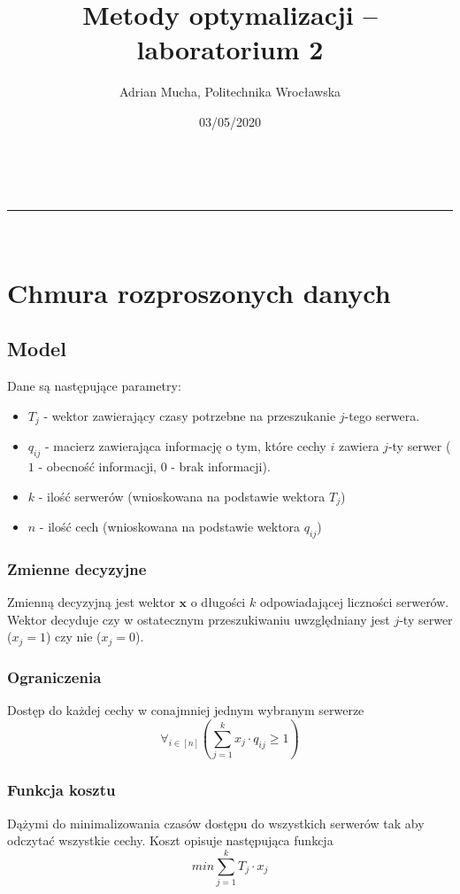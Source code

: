 \documentclass[a4paper,11pt]{article}
\makeatletter
\newcommand{\linia}{\rule{\linewidth}{0.5pt}}
\theoremstyle{mytheor}
\renewcommand{\maketitle}{
\begin{center}
\vspace{2ex}
{\huge \textsc{\@title}}
\vspace{1ex}
\\
\linia\\
\@author \hfill \@date
\vspace{4ex}
\end{center}
}
\makeatother
\begin{document}
\title{Metody optymalizacji – laboratorium 2}

\author{Adrian Mucha, Politechnika Wrocławska}

\date{03/05/2020}

\maketitle

\section{Chmura rozproszonych danych}

\subsection{Model}
Dane są następujące parametry:
\begin{itemize}
    \item $T_j$ - wektor zawierający czasy potrzebne na przeszukanie $j$-tego serwera.
    \item $q_{ij}$ - macierz zawierająca informację o tym, które cechy $i$ zawiera $j$-ty serwer ($1$ - obecność informacji, $0$ - brak informacji).
    \item $k$ - ilość serwerów (wnioskowana na podstawie wektora $T_j$)
    \item $n$ - ilość cech (wnioskowana na podstawie wektora $q_{ij}$)
\end{itemize}

\subsubsection{Zmienne decyzyjne}
Zmienną decyzyjną jest wektor $\mathbf{x}$ o długości $k$ odpowiadającej liczności serwerów. Wektor decyduje czy w ostatecznym przeszukiwaniu uwzględniany jest $j$-ty serwer ($x_j = 1$) czy nie ($x_j = 0$).

\subsubsection{Ograniczenia}
Dostęp do każdej cechy w conajmniej jednym wybranym serwerze
$$ \forall_{i\in[n]} (\sum_{j=1}^{k} x_j \cdot q_{ij} \geq 1) $$

\subsubsection{Funkcja kosztu}
Dążymi do minimalizowania czasów dostępu do wszystkich serwerów tak aby odczytać wszystkie cechy. Koszt opisuje następująca funkcja
$$ \textit{min}\sum_{j=1}^{k} T_j \cdot x_j $$
\end{document}
